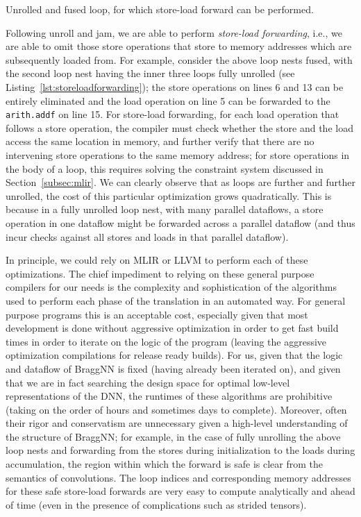 \begin{longlisting}
	\inputminted[highlightlines={5,6,11-13,16},linenos=true,numbersep=\mintednumbersep]{mlir}{sources/unrolled_loop.mlir}
	\caption{Unrolled and fused loop, for which store-load forward can be performed.}
	\label{lst:storeloadforwarding}
\end{longlisting}

Following unroll and jam, we are able to perform \emph{store-load forwarding}, i.e., we are able to omit those store operations that store to memory addresses which are subsequently loaded from.
For example, consider the above loop nests fused, with the second loop nest having the inner three loops fully unrolled (see Listing~\ref{lst:storeloadforwarding}); the store operations on lines 6 and 13 can be entirely eliminated and the load operation on line 5 can be forwarded to the \texttt{arith.addf} on line 15.
For store-load forwarding, for each load operation that follows a store operation, the compiler must check whether the store and the load access the same location in memory, and further verify that there are no intervening store operations to the same memory address;
for store operations in the body of a loop, this requires solving the constraint system discussed in Section~\ref{subsec:mlir}.
We can clearly observe that as loops are further and further unrolled, the cost of this particular optimization grows quadratically.
This is because in a fully unrolled loop nest, with many parallel dataflows, a store operation in one dataflow might be forwarded across a parallel dataflow (and thus incur checks against all stores and loads in that parallel dataflow).

In principle, we could rely on MLIR or LLVM to perform each of these optimizations.
The chief impediment to relying on these general purpose compilers for our needs is the complexity and sophistication of the algorithms used to perform each phase of the translation in an automated way.
For general purpose programs this is an acceptable cost, especially given that most development is done without aggressive optimization in order to get fast build times in order to iterate on the logic of the program (leaving the aggressive optimization compilations for release ready builds).
For us, given that the logic and dataflow of BraggNN is fixed (having already been iterated on), and given that we are in fact searching the design space for optimal low-level representations of the DNN, the runtimes of these algorithms are prohibitive (taking on the order of hours and sometimes days to complete).
Moreover, often their rigor and conservatism are unnecessary given a high-level understanding of the structure of BraggNN; for example, in the case of fully unrolling the above loop nests and forwarding from the stores during initialization to the loads during accumulation, the region within which the forward is safe is clear from the semantics of convolutions.
The loop indices and corresponding memory addresses for these safe store-load forwards are very easy to compute analytically and ahead of time (even in the presence of complications such as strided tensors).

